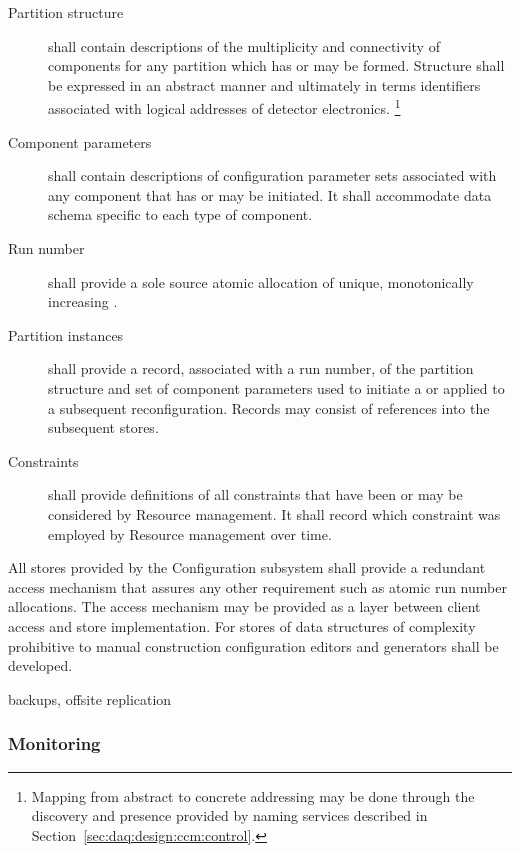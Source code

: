 \begin{description}

\item[Partition structure] shall contain descriptions of the multiplicity and connectivity of  components for any partition which has or may be formed. 
  Structure shall be expressed in an abstract manner and ultimately in terms identifiers associated with logical addresses of detector electronics. \footnote{Mapping from abstract to concrete addressing may be done through the discovery and presence provided by naming services described in Section~\ref{sec:daq:design:ccm:control}.}

\item[Component parameters] shall contain descriptions of configuration parameter sets associated with any  component that has or may be initiated.  It shall accommodate data schema specific to each type of component. 

\item[Run number] shall provide a sole source atomic allocation of unique, monotonically increasing .

\item[Partition instances] shall provide a record, associated with a run number, of the partition structure and set of component parameters used to initiate a  or applied to a subsequent reconfiguration.  Records may consist of references into the subsequent stores.

\item[Constraints] shall provide definitions of all constraints that have been or may be considered by Resource management. 
  It shall record which constraint was employed by Resource management over time.
\end{description}


All stores provided by the Configuration subsystem shall provide a redundant access mechanism that assures any other requirement such as atomic run number allocations. 
The access mechanism may be provided as a layer between client access and store implementation.
For stores of data structures of complexity prohibitive to manual construction configuration editors and generators shall be developed.

backups, offsite replication


\subsubsection{Monitoring}
\label{sec:daq:design:ccm:monitoring}

